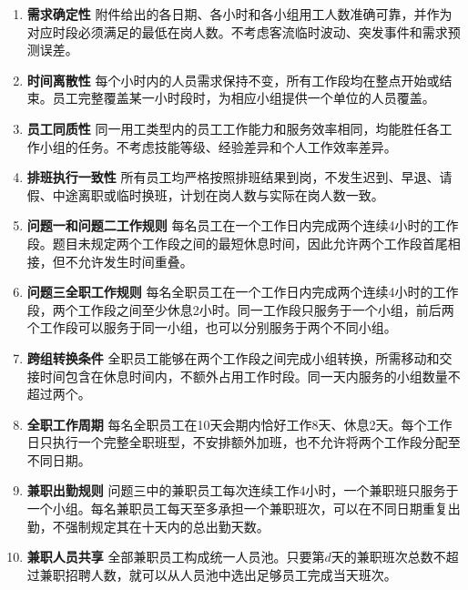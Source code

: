 \documentclass[withoutpreface,bwprint]{cumcmthesis}
\begin{document}
\begin{enumerate}[label=\textbf{A\arabic*:}, wide=\parindent]

  \item \textbf{需求确定性}
  附件给出的各日期、各小时和各小组用工人数准确可靠，并作为对应时段必须满足的最低在岗人数。不考虑客流临时波动、突发事件和需求预测误差。

  \item \textbf{时间离散性}
  每个小时内的人员需求保持不变，所有工作段均在整点开始或结束。员工完整覆盖某一小时段时，为相应小组提供一个单位的人员覆盖。

  \item \textbf{员工同质性}
  同一用工类型内的员工工作能力和服务效率相同，均能胜任各工作小组的任务。不考虑技能等级、经验差异和个人工作效率差异。

  \item \textbf{排班执行一致性}
  所有员工均严格按照排班结果到岗，不发生迟到、早退、请假、中途离职或临时换班，计划在岗人数与实际在岗人数一致。

  \item \textbf{问题一和问题二工作规则}
  每名员工在一个工作日内完成两个连续4小时的工作段。题目未规定两个工作段之间的最短休息时间，因此允许两个工作段首尾相接，但不允许发生时间重叠。

  \item \textbf{问题三全职工作规则}
  每名全职员工在一个工作日内完成两个连续4小时的工作段，两个工作段之间至少休息2小时。同一工作段只服务于一个小组，前后两个工作段可以服务于同一小组，也可以分别服务于两个不同小组。

  \item \textbf{跨组转换条件}
  全职员工能够在两个工作段之间完成小组转换，所需移动和交接时间包含在休息时间内，不额外占用工作时段。同一天内服务的小组数量不超过两个。

  \item \textbf{全职工作周期}
  每名全职员工在10天会期内恰好工作8天、休息2天。每个工作日只执行一个完整全职班型，不安排额外加班，也不允许将两个工作段分配至不同日期。

  \item \textbf{兼职出勤规则}
  问题三中的兼职员工每次连续工作4小时，一个兼职班只服务于一个小组。每名兼职员工每天至多承担一个兼职班次，可以在不同日期重复出勤，不强制规定其在十天内的总出勤天数。

  \item \textbf{兼职人员共享}
  全部兼职员工构成统一人员池。只要第$d$天的兼职班次总数不超过兼职招聘人数，就可以从人员池中选出足够员工完成当天班次。


\end{enumerate}
\end{document}
